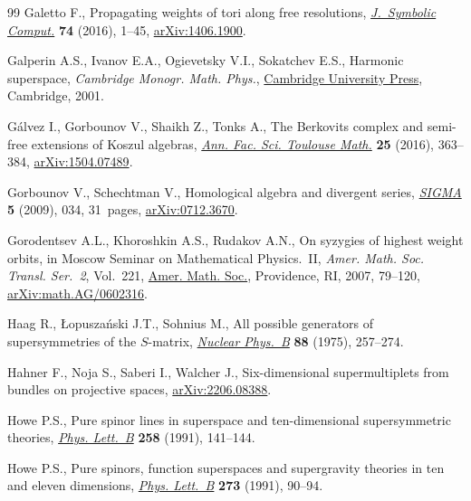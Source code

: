 \begin{thebibliography}{99}
Galetto F., Propagating weights of tori along free resolutions,
 \href{https://doi.org/10.1016/j.jsc.2015.05.004}{\textit{J.~Symbolic Comput.}} \textbf{74} (2016), 1--45, \href{https://arxiv.org/abs/1406.1900}{arXiv:1406.1900}.

Galperin A.S., Ivanov E.A., Ogievetsky V.I., Sokatchev E.S., Harmonic
 superspace, \textit{Cambridge Monogr. Math. Phys.}, \href{https://doi.org/10.1017/CBO9780511535109}{Cambridge University Press},
 Cambridge, 2001.

G\'alvez I., Gorbounov V., Shaikh Z., Tonks A., The {B}erkovits complex and
 semi-free extensions of {K}oszul algebras, \href{https://doi.org/10.5802/afst.1497}{\textit{Ann. Fac. Sci. Toulouse
 Math.}} \textbf{25} (2016), 363--384, \href{https://arxiv.org/abs/1504.07489}{arXiv:1504.07489}.

Gorbounov V., Schechtman V., Homological algebra and divergent series,
 \href{https://doi.org/10.3842/SIGMA.2009.034}{\textit{SIGMA}} \textbf{5} (2009), 034, 31~pages, \href{https://arxiv.org/abs/0712.3670}{arXiv:0712.3670}.

Gorodentsev A.L., Khoroshkin A.S., Rudakov A.N., On syzygies of highest weight
 orbits, in Moscow {S}eminar on {M}athematical {P}hysics.~{II}, \textit{Amer.
 Math. Soc. Transl. Ser.~2}, Vol.~221, \href{https://doi.org/10.1090/trans2/221/05}{Amer. Math. Soc.}, Providence, RI, 2007,
 79--120, \href{https://arxiv.org/abs/math.AG/0602316}{arXiv:math.AG/0602316}.

Haag R., {\L}opusza\'nski J.T., Sohnius M., All possible generators of
 supersymmetries of the {$S$}-matrix, \href{https://doi.org/10.1016/0550-3213(75)90279-5}{\textit{Nuclear Phys.~B}} \textbf{88}
 (1975), 257--274.

Hahner F., Noja S., Saberi I., Walcher J., Six-dimensional supermultiplets from
 bundles on projective spaces, \href{https://arxiv.org/abs/2206.08388}{arXiv:2206.08388}.

Howe P.S., Pure spinor lines in superspace and ten-dimensional supersymmetric
 theories, \href{https://doi.org/10.1016/0370-2693(91)91221-G}{\textit{Phys. Lett.~B}} \textbf{258} (1991), 141--144.

Howe P.S., Pure spinors, function superspaces and supergravity theories in ten
 and eleven dimensions, \href{https://doi.org/10.1016/0370-2693(91)90558-8}{\textit{Phys. Lett.~B}} \textbf{273} (1991), 90--94.


\end{thebibliography}
